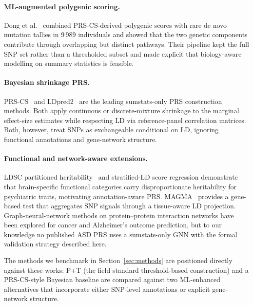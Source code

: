 \paragraph{ML-augmented polygenic scoring.}
Dong et al.~\cite{dong2023} combined PRS-CS-derived polygenic scores with
rare de novo mutation tallies in 9\,989 individuals and showed that the
two genetic components contribute through overlapping but distinct
pathways. Their pipeline kept the full SNP set rather than a thresholded
subset and made explicit that biology-aware modelling on summary
statistics is feasible.

\paragraph{Bayesian shrinkage PRS.}
PRS-CS~\cite{ge2019prscs} and LDpred2~\cite{prive2020ldpred2} are the
leading sumstats-only PRS construction methods. Both apply continuous or
discrete-mixture shrinkage to the marginal effect-size estimates while
respecting LD via reference-panel correlation matrices. Both, however,
treat SNPs as exchangeable conditional on LD, ignoring functional
annotations and gene-network structure.

\paragraph{Functional and network-aware extensions.}
LDSC partitioned heritability~\cite{finucane2015} and stratified-LD score
regression demonstrate that brain-specific functional categories carry
disproportionate heritability for psychiatric traits, motivating
annotation-aware PRS. MAGMA~\cite{deleeuw2015magma} provides a
gene-based test that aggregates SNP signals through a tissue-aware LD
projection. Graph-neural-network methods on protein--protein interaction
networks have been explored for cancer and Alzheimer's outcome
prediction, but to our knowledge no published ASD PRS uses a sumstats-only
GNN with the formal validation strategy described here.

\medskip\noindent
The methods we benchmark in Section~\ref{sec:methods} are positioned
directly against these works: P+T (the field standard threshold-based
construction) and a PRS-CS-style Bayesian baseline are compared against
two ML-enhanced alternatives that incorporate either SNP-level
annotations or explicit gene-network structure.
